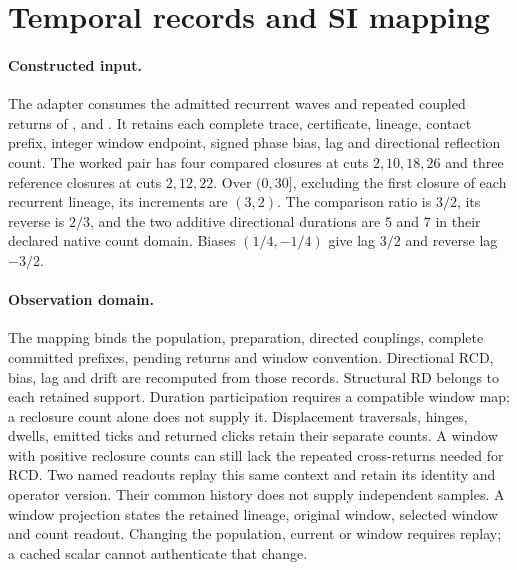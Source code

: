 \section{Temporal records and SI mapping}
\label{manual:m3-temporal}
\paragraph{Constructed input.}
The adapter consumes the admitted recurrent waves and repeated coupled returns of
,
 and
.
It retains each complete trace, certificate, lineage, contact prefix, integer
window endpoint, signed phase bias, lag and directional reflection count.
The worked pair has four compared closures at cuts \(2,10,18,26\) and three
reference closures at cuts \(2,12,22\). Over \((0,30]\), excluding the first
closure of each recurrent lineage, its increments are \((3,2)\).
The comparison ratio is \(3/2\), its reverse is \(2/3\), and the two
additive directional durations are \(5\) and \(7\) in their declared native
count domain. Biases \((1/4,-1/4)\) give lag \(3/2\) and reverse lag \(-3/2\).

\paragraph{Observation domain.}
The mapping binds the population, preparation, directed couplings, complete
committed prefixes, pending returns and window convention. Directional RCD, bias, lag and drift are recomputed from those records.
Structural RD belongs to each retained support. Duration participation requires
a compatible window map; a reclosure count alone does not supply it. Displacement traversals, hinges, dwells, emitted ticks and
returned clicks retain their separate counts. A window with positive reclosure
counts can still lack the repeated cross-returns needed for RCD.
Two named readouts replay this same context and retain its identity and
operator version. Their common history does not supply independent samples.
A window projection states the retained lineage, original window, selected
window and count readout. Changing the population, current or window requires
replay; a cached scalar cannot authenticate that change.

